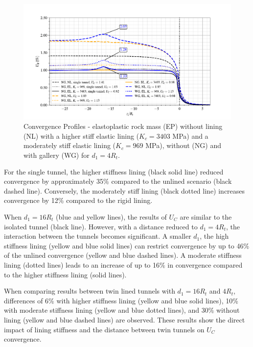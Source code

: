 \documentclass[a4paper,fleqn]{cas-sc}
\begin{document}
\begin{figure}[h!]
	\centering
	\includegraphics[scale=0.9]{Convergence Profiles - EP_d1_4Ri_anotate.pdf}
	\caption{Convergence Profiles - elastoplastic rock mass (EP) without lining (NL) with a higher stiff elastic lining ($K_c = 3403$ MPa) and a moderately stiff elastic lining ($K_c = 969$ MPa), without (NG) and with gallery (WG) for $d_1 = 4R_t$.}
	\label{EP_d1_4Ri}
\end{figure}
\FloatBarrier

For the single tunnel, the higher stiffness lining (black solid line) reduced convergence by approximately 35\% compared to the unlined scenario (black dashed line). Conversely, the moderately stiff lining (black dotted line) increases convergence by 12\% compared to the rigid lining. 

When $d_1 = 16R_t$ (blue and yellow lines), the results of $U_{C}$ are similar to the isolated tunnel (black line). However, with a distance reduced to $d_1 = 4R_t$, the interaction between the tunnels becomes significant. A smaller $d_1$, the high stiffness lining (yellow and blue solid lines) can restrict convergence by up to 46\% of the unlined convergence (yellow and blue dashed lines). A moderate stiffness lining (dotted lines) leads to an increase of up to 16\% in convergence compared to the higher stiffness lining (solid lines).

When comparing results between twin lined tunnels with $d_1 = 16R_t$ and $4R_t$, differences of 6\% with higher stiffness lining (yellow and blue solid lines), 10\% with moderate stiffness lining (yellow and blue dotted lines), and 30\% without lining (yellow and blue dashed lines) are observed. These results show the direct impact of lining stiffness and the distance between twin tunnels on $U_{C}$ convergence.
\end{document}
